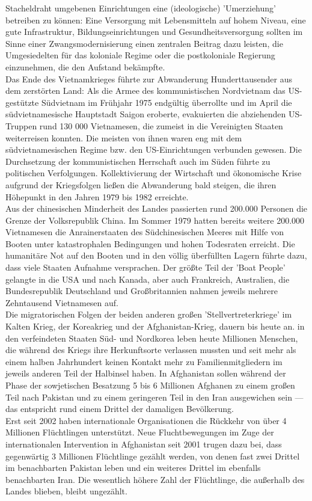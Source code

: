 \documentclass[letterpaper, 12pt]{article}
\begin{document}
Stacheldraht umgebenen Einrichtungen eine (ideologische) 'Umerziehung' betreiben zu können: Eine Versorgung mit Lebensmitteln auf hohem Niveau, eine gute Infrastruktur, Bildungseinrichtungen und Gesundheitsversorgung sollten im Sinne einer Zwangsmodernisierung einen zentralen Beitrag dazu leisten, die Umgesiedelten für das koloniale Regime oder die postkoloniale Regierung einzunehmen, die den Aufstand bekämpfte. \\ Das Ende des Vietnamkrieges führte zur Abwanderung Hunderttausender aus dem zerstörten Land: Als die Armee des kommunistischen Nordvietnam das US-gestützte Südvietnam im Frühjahr 1975 endgültig überrollte und im April die südvietnamesische Hauptstadt Saigon eroberte, evakuierten die abziehenden US-Truppen rund 130 000 Vietnamesen, die zumeist in die Vereinigten Staaten weiterreisen konnten. Die meisten von ihnen waren eng mit dem südvietnamesischen Regime bzw. den US-Einrichtungen verbunden gewesen. Die Durchsetzung der kommunistischen Herrschaft auch im Süden führte zu politischen Verfolgungen. Kollektivierung der Wirtschaft und ökonomische Krise aufgrund der Kriegsfolgen ließen die Abwanderung bald steigen, die ihren Höhepunkt in den Jahren 1979 bis 1982 erreichte. \\ Aus der chinesischen Minderheit des Landes passierten rund 200.000 Personen die Grenze der Volksrepublik China. Im Sommer 1979 hatten bereits weitere 200.000 Vietnamesen die Anrainerstaaten des Südchinesischen Meeres mit Hilfe von Booten unter katastrophalen Bedingungen und hohen Todesraten erreicht. Die humanitäre Not auf den Booten und in den völlig überfüllten Lagern führte dazu, dass viele Staaten Aufnahme versprachen. Der größte Teil der 'Boat People' gelangte in die USA und nach Kanada, aber auch Frankreich, Australien, die Bundesrepublik Deutschland und Großbritannien nahmen jeweils mehrere Zehntausend Vietnamesen auf. \\ Die migratorischen Folgen der beiden anderen großen 'Stellvertreterkriege' im Kalten Krieg, der Koreakrieg und der Afghanistan-Krieg, dauern bis heute an. in den verfeindeten Staaten Süd- und Nordkorea leben heute Millionen Menschen, die während des Kriegs ihre Herkunftsorte verlassen mussten und seit mehr als einem halben Jahrhundert keinen Kontakt mehr zu Familienmitgliedern im jeweils anderen Teil der Halbinsel haben. In Afghanistan sollen während der Phase der sowjetischen Besatzung 5 bis 6 Millionen Afghanen zu einem großen Teil nach Pakistan und zu einem geringeren Teil in den Iran ausgewichen sein — das entspricht rund einem Drittel der damaligen Bevölkerung. \\ Erst seit 2002 haben internationale Organisationen die Rückkehr von über 4 Millionen Flüchtlingen unterstützt. Neue Fluchtbewegungen im Zuge der internationalen Intervention in Afghanistan seit 2001 trugen dazu bei, dass gegenwärtig 3 Millionen Flüchtlinge gezählt werden, von denen fast zwei Drittel im benachbarten Pakistan leben und ein weiteres Drittel im ebenfalls benachbarten Iran. Die wesentlich höhere Zahl der Flüchtlinge, die außerhalb des Landes blieben, bleibt ungezählt.


\clearpage


\end{document}

